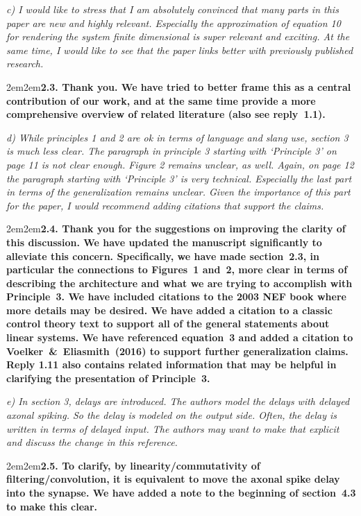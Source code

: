 \documentclass[a4paper]{article}
\newcommand{\newl}{\par\null\par}
\newcommand{\REVIEW}[1]{{\it #1}}
\newcommand{\REPLY}[1]{\newl\begin{adjustwidth}{2em}{2em}{\bf #1}\end{adjustwidth}\newl}
\begin{document}
\REVIEW{c)      I would like to stress that I am absolutely convinced that many parts in this paper are new and highly relevant. Especially the approximation of equation 10 for rendering the system finite dimensional is super relevant and exciting. At the same time, I would like to see that the paper links better with previously published research.}

\REPLY{2.3. Thank you. We have tried to better frame this as a central contribution of our work, and at the same time provide a more comprehensive overview of related literature (also see reply~1.1).}

\REVIEW{d)      While principles 1 and 2 are ok in terms of language and slang use, section 3 is much less clear. The paragraph in principle 3 starting with `Principle 3' on page 11 is not clear enough. Figure 2 remains unclear, as well. Again, on page 12 the paragraph starting with `Principle 3' is very technical. Especially the last part in terms of the generalization remains unclear. Given the importance of this part for the paper, I would recommend adding citations that support the claims.}

\REPLY{2.4. Thank you for the suggestions on improving the clarity of this discussion. 
We have updated the manuscript significantly to alleviate this concern.  Specifically, we have made section~2.3, in particular the connections to Figures~1 and~2, more clear in terms of describing the architecture and what we are trying to accomplish with Principle~3. 
We have included citations to the 2003 NEF book where more details may be desired.
We have added a citation to a classic control theory text to support all of the general statements about linear systems.
We have referenced equation~3 and added a citation to Voelker~\&~Eliasmith~(2016) to support further generalization claims.
Reply 1.11 also contains related information that may be helpful in clarifying the presentation of Principle~3.}

\REVIEW{e)      In section 3, delays are introduced. The authors model the delays with delayed axonal spiking. So the delay is modeled on the output side. Often, the delay is written in terms of delayed input. The authors may want to make that explicit and discuss the change in this reference.}

\REPLY{2.5. To clarify, by linearity/commutativity of filtering/convolution, it is equivalent to move the axonal spike delay into the synapse.
We have added a note to the beginning of section~4.3 to make this clear.}
\end{document}
